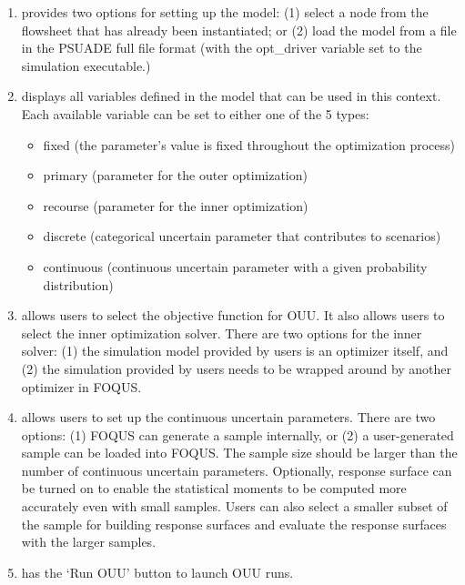 \begin{enumerate}
\item
	 provides two options for setting up the model: (1) select a node from
         the flowsheet that has already been instantiated; or (2) load the model from 
         a file in the PSUADE full file format (with the {\sf opt\_driver} variable
         set to the simulation executable.)
\item 
	 displays all variables defined in the model that can be used in
         this context. Each available variable can be set to either one of
         the 5 types:
         \begin{itemize}
         \item fixed (the parameter's value is fixed throughout the optimization
         process)
         \item primary (parameter for the outer optimization)
         \item recourse (parameter for the
         inner optimization)
         \item discrete (categorical uncertain parameter that contributes to
         scenarios)
         \item continuous (continuous uncertain parameter with a given
         probability distribution)
         \end{itemize} 
\item
	 allows users to select the objective function for 
         OUU. It also allows users to select the inner optimization solver. There
         are two options for the inner solver: (1) the simulation model provided 
         by users is an optimizer itself, and (2) the simulation provided by 
         users needs to be wrapped around by another optimizer in FOQUS.

\item
	 allows users to set up the continuous uncertain parameters.
        There are two options: (1) FOQUS can generate a sample internally, or (2)
        a user-generated sample can be loaded into FOQUS.  The sample size should
        be larger than the number of continuous uncertain parameters. Optionally,
        response surface can be turned on to enable the statistical moments to be
        computed more accurately even with small samples. Users can also select
        a smaller subset of the sample for building response surfaces and evaluate
        the response surfaces with the larger samples.

\item
	 has the `Run OUU' button to launch OUU runs.
\end{enumerate}

